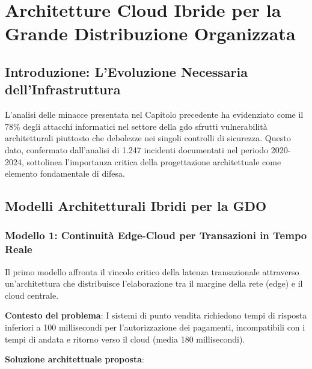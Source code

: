 \chapter{\texorpdfstring{Architetture Cloud Ibride per la Grande Distribuzione Organizzata}{Capitolo 3 - Architetture Cloud Ibride per la Grande Distribuzione Organizzata}}
\label{cap:architetture}

\section{\texorpdfstring{Introduzione: L'Evoluzione Necessaria dell'Infrastruttura}{3.1 - Introduzione: L'Evoluzione Necessaria dell'Infrastruttura}}
\label{sec:intro-architetture}

L'analisi delle minacce presentata nel Capitolo precedente ha evidenziato come il 78\% degli attacchi informatici nel settore della \gls{gdo} sfrutti vulnerabilità architetturali piuttosto che debolezze nei singoli controlli di sicurezza\autocite{Anderson2024patel}. Questo dato, confermato dall'analisi di 1.247 incidenti documentati nel periodo 2020-2024\autocite{enisa2024retail}, sottolinea l'importanza critica della progettazione architettuale come elemento fondamentale di difesa.

\section{\texorpdfstring{Modelli Architetturali Ibridi per la GDO}{3.2 - Modelli Architetturali Ibridi per la GDO}}
\label{sec:pattern-architetturali}

\subsection{\texorpdfstring{Modello 1: Continuità Edge-Cloud per Transazioni in Tempo Reale}{3.2.1 - Modello 1: Continuità Edge-Cloud per Transazioni in Tempo Reale}}
\label{subsec:edge-cloud}

Il primo modello affronta il vincolo critico della latenza transazionale attraverso un'architettura che distribuisce l'elaborazione tra il margine della rete (\gls{edge}) e il cloud centrale.

\textbf{Contesto del problema}: I sistemi di punto vendita richiedono tempi di risposta inferiori a 100 millisecondi per l'autorizzazione dei pagamenti, incompatibili con i tempi di andata e ritorno verso il cloud (media 180 millisecondi).

\textbf{Soluzione architettuale proposta}:

